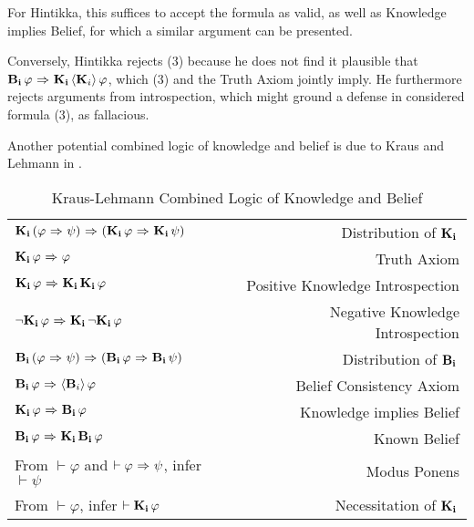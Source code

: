 For Hintikka, this suffices to accept the formula as valid, as well as Knowledge implies Belief, for which a similar argument can be presented.

Conversely, Hintikka rejects (3) because he does not find it plausible that \\$\mathbf{B}_{\mathbf{i}}\,\varphi {\ \Rightarrow \ } \mathbf{K}_{\mathbf{i}}\,\langle \mathbf{K}_{i} \rangle\,\varphi$, which (3) and the Truth Axiom jointly imply. He furthermore rejects arguments from introspection, which might ground a defense in considered formula (3), as fallacious. 

Another potential combined logic of knowledge and belief is due to Kraus and Lehmann in \cite{KrausLehmann}.

\begin{table}[H]
	\begin{center}
		\begin{tabular}{| l r |}
			\hline
			$\mathbf{K}_{\mathbf{i}}\,(\varphi {\ \Rightarrow \ } \psi) {\ \Rightarrow \ } (\mathbf{K}_{\mathbf{i}}\,\varphi {\ \Rightarrow \ } \mathbf{K}_{\mathbf{i}}\,\psi)$ & Distribution of $\mathbf{K}_{\mathbf{i}}\,$ \\
			$\mathbf{K}_{\mathbf{i}}\,\varphi {\ \Rightarrow \ } \varphi$ & Truth Axiom \\
			$\mathbf{K}_{\mathbf{i}}\,\varphi {\ \Rightarrow \ } \mathbf{K}_{\mathbf{i}}\,\mathbf{K}_{\mathbf{i}}\,\varphi$ & Positive Knowledge Introspection\\
			${\neg}\mathbf{K}_{\mathbf{i}}\,\varphi {\ \Rightarrow \ } \mathbf{K}_{\mathbf{i}}\,{\neg}\mathbf{K}_{\mathbf{i}}\,\varphi$ & Negative Knowledge Introspection\\
			$\mathbf{B}_{\mathbf{i}}\,(\varphi {\ \Rightarrow \ } \psi) {\ \Rightarrow \ } (\mathbf{B}_{\mathbf{i}}\,\varphi {\ \Rightarrow \ } \mathbf{B}_{\mathbf{i}}\,\psi)$ & Distribution of $\mathbf{B}_{\mathbf{i}}\,$\\
			$\mathbf{B}_{\mathbf{i}}\,\varphi {\ \Rightarrow \ } \langle \mathbf{B}_{i} \rangle\,\varphi$ & Belief Consistency Axiom\\
			$\mathbf{K}_{\mathbf{i}}\,\varphi {\ \Rightarrow \ } \mathbf{B}_{\mathbf{i}}\,\varphi$ & Knowledge implies Belief \\
			$\mathbf{B}_{\mathbf{i}}\,\varphi {\ \Rightarrow \ } \mathbf{K}_{\mathbf{i}}\,\mathbf{B}_{\mathbf{i}}\,\varphi$ & Known Belief\\
			From $\vdash \varphi$ and $\vdash \varphi {\ \Rightarrow \ } \psi$, infer $\vdash\psi$ & Modus Ponens\\
			From $\vdash \varphi$, infer $\vdash \mathbf{K}_{\mathbf{i}}\,\varphi$ & Necessitation of $\mathbf{K}_{\mathbf{i}}\,$\\
			\hline
		\end{tabular}
		\caption{Kraus-Lehmann Combined Logic of Knowledge and Belief}
	\end{center}
\end{table}

